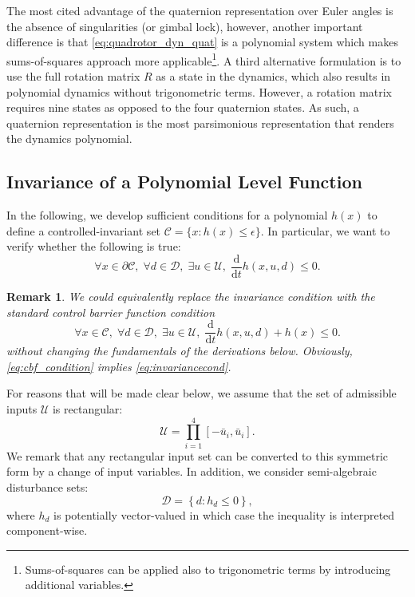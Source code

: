 \documentclass[conference]{IEEEtran}
\newtheorem{remark}{Remark}
\begin{document}
The most cited advantage of the quaternion representation over Euler angles is the absence of singularities (or gimbal lock), however, another important difference is that \eqref{eq:quadrotor_dyn_quat} is a polynomial system which makes sums-of-squares approach more applicable\footnote{Sums-of-squares can be applied also to trigonometric terms by introducing additional variables.}. A third alternative formulation is to use the full rotation matrix $R$ as a state in the dynamics, which also results in polynomial dynamics without trigonometric terms. However, a rotation matrix requires nine states as opposed to the four quaternion states. As such, a quaternion representation is the most parsimonious representation that renders the dynamics polynomial.

\subsection{Invariance of a Polynomial Level Function}

In the following, we develop sufficient conditions for a polynomial $h(x)$ to define a controlled-invariant set $\mathcal C = \{ x : h(x) \leq \epsilon \}$. In particular, we want to verify whether the following is true:
\begin{equation}
\label{eq:invariancecond}
   \forall x \in \partial \mathcal C, \;  \forall d \in \mathcal D, \; \exists u \in \mathcal U, \; \frac{\mathrm{d}}{\mathrm{d}t} h(x,u,d) \leq 0.
 \end{equation} 
\begin{remark}
  We could equivalently replace the invariance condition with the standard control barrier function condition
  \begin{equation}
  \label{eq:cbf_condition}
    \forall x \in \mathcal C, \;  \forall d \in \mathcal D, \; \exists u \in \mathcal U, \; \frac{\mathrm{d}}{\mathrm{d}t} h(x,u,d) + h(x) \leq 0.
  \end{equation}
  without changing the fundamentals of the derivations below. Obviously, \eqref{eq:cbf_condition} implies \eqref{eq:invariancecond}.
\end{remark}
 For reasons that will be made clear below, we assume that the set of admissible inputs $\mathcal U$ is rectangular:
 \begin{equation}
   \mathcal U = \prod_{i=1}^4 [-\bar u_i, \bar u_i].
 \end{equation}
 We remark that any rectangular input set can be converted to this symmetric form by a change of input variables. In addition, we consider semi-algebraic disturbance sets:
\begin{equation}
  \mathcal D = \left\{ d : h_d \leq 0 \right\},
\end{equation}
where $h_d$ is potentially vector-valued in which case the inequality is interpreted component-wise.
\end{document}
